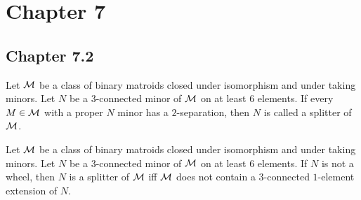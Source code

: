 \section{Chapter 7}

\subsection{Chapter 7.2}

\begin{definition}[splitter]
  \label{def:splitter}
  Let $\mathcal{M}$ be a class of binary matroids closed under isomorphism and under taking minors. Let $N$ be a $3$-connected minor of $\mathcal{M}$ on at least $6$ elements.
  If every $M \in \mathcal{M}$ with a proper $N$ minor has a $2$-separation, then $N$ is called a splitter of $\mathcal{M}$.
\end{definition}

\begin{theorem}
  \label{thm:7.2.1.a}
  Let $\mathcal{M}$ be a class of binary matroids closed under isomorphism and under taking minors. Let $N$ be a $3$-connected minor of $\mathcal{M}$ on at least $6$ elements.
  If $N$ is not a wheel, then $N$ is a splitter of $\mathcal{M}$ iff $\mathcal{M}$ does not contain a $3$-connected $1$-element extension of $N$.
\end{theorem}

